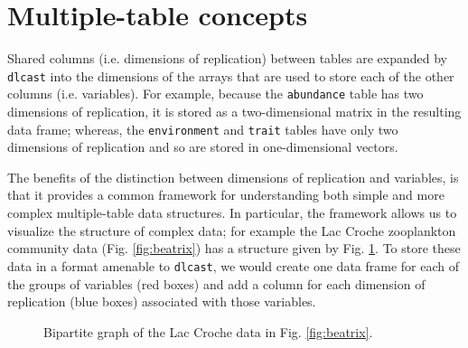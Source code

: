 \documentclass{article}
\newcommand{\code}[1]{\texttt{#1}}
\numberwithin{exercise}{section}
\begin{document}
\section{Multiple-table concepts}

Shared columns (i.e. dimensions of replication) between tables are expanded by \code{dlcast} into the dimensions of the arrays that are used to store each of the other columns (i.e. variables).  For example, because the \code{abundance} table has two dimensions of replication, it is stored as a two-dimensional matrix in the resulting data frame; whereas, the \code{environment} and \code{trait} tables have only two dimensions of replication and so are stored in one-dimensional vectors.

The benefits of the distinction between dimensions of replication and variables, is that it provides a common framework for understanding both simple and more complex multiple-table data structures.  In particular, the framework allows us to visualize the structure of complex data; for example the Lac Croche zooplankton community data (Fig. \ref{fig:beatrix}) has a structure given by Fig. \ref{fig:bipartitebeatrix}.  To store these data in a format amenable to \code{dlcast}, we would create one data frame for each of the groups of variables (red boxes) and add a column for each dimension of replication (blue boxes) associated with those variables.

\begin{figure}
\caption{Bipartite graph of the Lac Croche data in Fig. \ref{fig:beatrix}.} 
\label{fig:bipartitebeatrix}
\end{figure}
\end{document}
